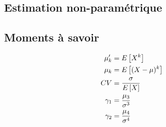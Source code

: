 \documentclass[french, landscape]{article}
\begin{document}
\small
\begin{multicols*}{3} %

\section{Estimation non-paramétrique}
\subsection*{Moments à savoir}
\begin{align*}
\mu_k^{\prime} 	& = E \left[ X^k \right] \\
\mu_k			& = E \left[ (X-\mu)^k \right] \\
CV				& = \frac{\sigma}{E \left[ X \right]} \\
\gamma_1			& = \frac{\mu_3}{\sigma^3}  \\
\gamma_2			& = \frac{\mu_4}{\sigma^4} \\
\end{align*}


\end{multicols*}
\end{document}
